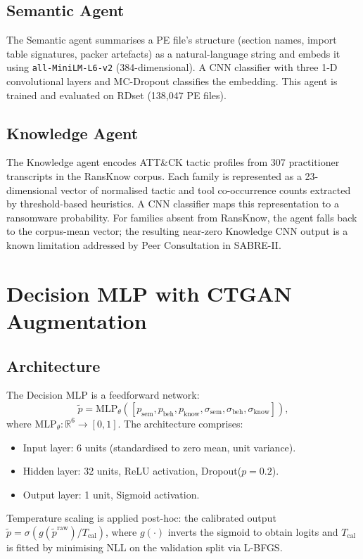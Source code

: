 \documentclass[journal]{IEEEtran}
\newcommand{\sem}{\mathrm{sem}}
\newcommand{\beh}{\mathrm{beh}}
\newcommand{\know}{\mathrm{know}}
\newcommand{\pfused}{\tilde{p}}
\begin{document}
\subsection{Semantic Agent}

The Semantic agent summarises a PE file's structure (section names,
import table signatures, packer artefacts) as a natural-language string
and embeds it using \texttt{all-MiniLM-L6-v2} (384-dimensional).
A CNN classifier with three 1-D convolutional layers and MC-Dropout
classifies the embedding.
This agent is trained and evaluated on RDset (138,047 PE files).

\subsection{Knowledge Agent}

The Knowledge agent encodes ATT\&CK tactic profiles from 307
practitioner transcripts in the RansKnow corpus.
Each family is represented as a 23-dimensional vector of normalised
tactic and tool co-occurrence counts extracted by threshold-based
heuristics.
A CNN classifier maps this representation to a ransomware probability.
For families absent from RansKnow, the agent falls back to the
corpus-mean vector; the resulting near-zero Knowledge CNN output is a known
limitation addressed by Peer Consultation in SABRE-II.


\section{Decision MLP with CTGAN Augmentation}
\label{sec:decision_mlp}

\subsection{Architecture}

The Decision MLP is a feedforward network:
\begin{equation}
  \pfused = \mathrm{MLP}_\theta\!\left(
    [p_{\sem}, p_{\beh}, p_{\know}, \sigma_{\sem}, \sigma_{\beh}, \sigma_{\know}]
  \right),
  \label{eq:mlp}
\end{equation}
where $\mathrm{MLP}_\theta : \mathbb{R}^6 \to [0,1]$.
The architecture comprises:
\begin{itemize}
  \item Input layer: 6 units (standardised to zero mean, unit variance).
  \item Hidden layer: 32 units, ReLU activation, Dropout($p=0.2$).
  \item Output layer: 1 unit, Sigmoid activation.
\end{itemize}
Temperature scaling is applied post-hoc: the calibrated output
$\pfused = \sigma(g(\pfused^{\mathrm{raw}}) / T_{\mathrm{cal}})$,
where $g(\cdot)$ inverts the sigmoid to obtain logits and
$T_{\mathrm{cal}}$ is fitted by minimising NLL on the validation split
via L-BFGS.
\end{document}
